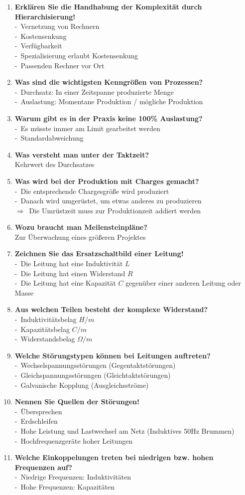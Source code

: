 \documentclass[a4paper,12pt]{article}
\newcommand{\questionnopage}[2]{\pagebreak[3]\item {\textbf{#1?}}#2}
\newcommand{\statementnopage}[2]{\pagebreak[3]\item {\textbf{#1!}}#2}
\newcommand{\catchword}[1]{\\-\ #1}
\newcommand{\normaltext}[1]{\\#1}
\newcommand{\result}[1]{\\$\Rightarrow$\ #1}
\begin{document}
\begin{enumerate}
  \statementnopage{Erklären Sie die Handhabung der Komplexität durch Hierarchisierung}
  {
    \catchword{Vernetzung von Rechnern}
    \catchword{Kostensenkung}
    \catchword{Verfügbarkeit}
    \catchword{Spezialisierung erlaubt Kostensenkung}
    \catchword{Passenden Rechner vor Ort}
  }

  \questionnopage{Was sind die wichtigsten Kenngrößen von Prozessen}
  {
    \catchword{Durchsatz: In einer Zeitspanne produzierte Menge}
    \catchword{Auslastung: Momentane Produktion / mögliche Produktion}
  }

  \questionnopage{Warum gibt es in der Praxis keine 100\% Auslastung}
  {
    \catchword{Es müsste immer am Limit gearbeitet werden}
    \catchword{Standardabweichung}
  }

  \questionnopage{Was versteht man unter der Taktzeit}
  {
    \normaltext{Kehrwert des Durchsatzes}
  }

  \questionnopage{Was wird bei der Produktion mit Charges gemacht}
  {
    \catchword{Die entsprechende Chargesgröße wird produziert}
    \catchword{Danach wird umgerüstet, um etwas anderes zu produzieren}
    \result{Die Umrüstzeit muss zur Produktionzeit addiert werden}
  }

  \questionnopage{Wozu braucht man Meilensteinpläne}
  {
    \normaltext{Zur Überwachung eines größeren Projektes}
  }

  \statementnopage{Zeichnen Sie das Ersatzschaltbild einer Leitung}
  {
    \catchword{Die Leitung hat eine Induktivität $L$}
    \catchword{Die Leitung hat einen Widerstand $R$}
    \catchword{Die Leitung hat eine Kapazität $C$ gegenüber einer anderen Leitung oder Masse}
  }

  \questionnopage{Aus welchen Teilen besteht der komplexe Widerstand}
  {
    \catchword{Induktivitätsbelag $H/m$}
    \catchword{Kapazitätsbelag $C/m$}
    \catchword{Widerstandsbelag $\Omega/m$}
  }

  \questionnopage{Welche Störungstypen können bei Leitungen auftreten}
  {
    \catchword{Wechselspannungsstörungen (Gegentaktstörungen)}
    \catchword{Gleichspannungsstörungen (Gleichtaktstörungen)}
    \catchword{Galvanische Kopplung (Ausgleichsströme)}
  }

  \statementnopage{Nennen Sie Quellen der Störungen}
  {
    \catchword{Übersprechen}
    \catchword{Erdschleifen}
    \catchword{Hohe Leistung und Lastwechsel am Netz (Induktives 50Hz Brummen)}
    \catchword{Hochfrequenzgeräte hoher Leitungen}
  }

  \questionnopage{Welche Einkoppelungen treten bei niedrigen bzw. hohen Frequenzen auf}
  {
    \catchword{Niedrige Frequenzen: Induktivitäten}
    \catchword{Hohe Frequenzen: Kapazitäten}
  }


\end{enumerate}
\end{document}
